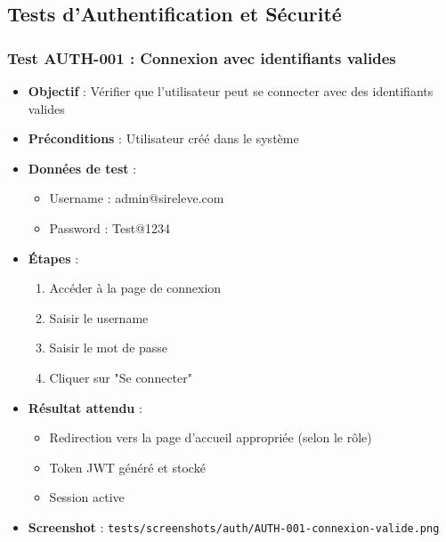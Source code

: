 \subsection{Tests d'Authentification et Sécurité}

\subsubsection{Test AUTH-001 : Connexion avec identifiants valides}
\begin{itemize}
    \item \textbf{Objectif} : Vérifier que l'utilisateur peut se connecter avec des identifiants valides
    \item \textbf{Préconditions} : Utilisateur créé dans le système
    \item \textbf{Données de test} :
        \begin{itemize}
            \item Username : admin@sireleve.com
            \item Password : Test@1234
        \end{itemize}
    \item \textbf{Étapes} :
        \begin{enumerate}
            \item Accéder à la page de connexion
            \item Saisir le username
            \item Saisir le mot de passe
            \item Cliquer sur "Se connecter"
        \end{enumerate}
    \item \textbf{Résultat attendu} : 
        \begin{itemize}
            \item Redirection vers la page d'accueil appropriée (selon le rôle)
            \item Token JWT généré et stocké
            \item Session active
        \end{itemize}
    \item \textbf{Screenshot} : \texttt{tests/screenshots/auth/AUTH-001-connexion-valide.png}
\end{itemize}

